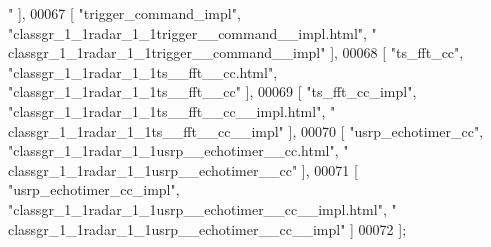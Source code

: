 \begin{DoxyCode}
{      "} ],
00067     [ \textcolor{stringliteral}{"trigger\_command\_impl"}, \textcolor{stringliteral}{"classgr\_1\_1radar\_1\_1trigger\_\_command\_\_impl.html"}, \textcolor{stringliteral}{"
      classgr\_1\_1radar\_1\_1trigger\_\_command\_\_impl"} ],
00068     [ \textcolor{stringliteral}{"ts\_fft\_cc"}, \textcolor{stringliteral}{"classgr\_1\_1radar\_1\_1ts\_\_fft\_\_cc.html"}, \textcolor{stringliteral}{"classgr\_1\_1radar\_1\_1ts\_\_fft\_\_cc"} ],
00069     [ \textcolor{stringliteral}{"ts\_fft\_cc\_impl"}, \textcolor{stringliteral}{"classgr\_1\_1radar\_1\_1ts\_\_fft\_\_cc\_\_impl.html"}, \textcolor{stringliteral}{"
      classgr\_1\_1radar\_1\_1ts\_\_fft\_\_cc\_\_impl"} ],
00070     [ \textcolor{stringliteral}{"usrp\_echotimer\_cc"}, \textcolor{stringliteral}{"classgr\_1\_1radar\_1\_1usrp\_\_echotimer\_\_cc.html"}, \textcolor{stringliteral}{"
      classgr\_1\_1radar\_1\_1usrp\_\_echotimer\_\_cc"} ],
00071     [ \textcolor{stringliteral}{"usrp\_echotimer\_cc\_impl"}, \textcolor{stringliteral}{"classgr\_1\_1radar\_1\_1usrp\_\_echotimer\_\_cc\_\_impl.html"}, \textcolor{stringliteral}{"
      classgr\_1\_1radar\_1\_1usrp\_\_echotimer\_\_cc\_\_impl"} ]
00072 ];
\end{DoxyCode}
